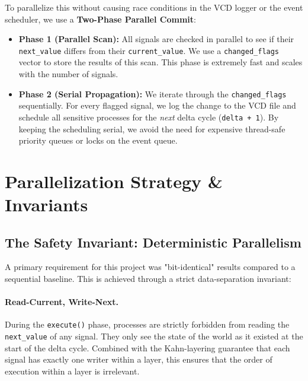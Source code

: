 \documentclass[9pt,a4paper]{article}
\begin{document}
To parallelize this without causing race conditions in the VCD logger or the event scheduler, we use a \textbf{Two-Phase Parallel Commit}:
\begin{itemize}
    \item \textbf{Phase 1 (Parallel Scan):} All signals are checked in parallel to see if their \texttt{next\_value} differs from their \texttt{current\_value}. We use a \texttt{changed\_flags} vector to store the results of this scan. This phase is extremely fast and scales with the number of signals.
    \item \textbf{Phase 2 (Serial Propagation):} We iterate through the \texttt{changed\_flags} sequentially. For every flagged signal, we log the change to the VCD file and schedule all sensitive processes for the \textit{next} delta cycle (\texttt{delta + 1}). By keeping the scheduling serial, we avoid the need for expensive thread-safe priority queues or locks on the event queue.
\end{itemize}

\section{Parallelization Strategy \& Invariants}

\subsection{The Safety Invariant: Deterministic Parallelism}
A primary requirement for this project was "bit-identical" results compared to a sequential baseline. This is achieved through a strict data-separation invariant:
\paragraph{Read-Current, Write-Next.} During the \texttt{execute()} phase, processes are strictly forbidden from reading the \texttt{next\_value} of any signal. They only see the state of the world as it existed at the start of the delta cycle. Combined with the Kahn-layering guarantee that each signal has exactly one writer within a layer, this ensures that the order of execution within a layer is irrelevant.
\end{document}
